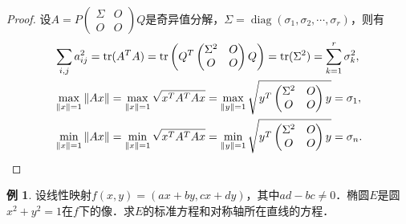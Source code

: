 \documentclass[a4paper,fontset=windows]{ctexbook}
\theoremstyle{definition}
\newtheorem{example}{例}[chapter]
\DeclareMathOperator{\diag}{diag}
\DeclareMathOperator{\tr}{tr}
\begin{document}
\begin{proof}
设$A=P\begin{pmatrix}\Sigma&O \\ O&O\end{pmatrix}Q$是奇异值分解，$\Sigma=\diag(\sigma_1,\sigma_2,\cdots,\sigma_r)$，则有
\begin{align*}
&\sum_{i,j}a_{ij}^2=\tr(A^TA)=\tr\left(Q^T\begin{pmatrix}\Sigma^2&O \\ O&O\end{pmatrix}Q\right)=\tr(\Sigma^2)=\sum_{k=1}^r\sigma_k^2, \\
&\max_{\|x\|=1}\|Ax\|=\max_{\|x\|=1}\sqrt{x^TA^TAx}=\max_{\|y\|=1}\sqrt{y^T\begin{pmatrix}\Sigma^2&O \\ O&O\end{pmatrix}y}=\sigma_1, \\
&\min_{\|x\|=1}\|Ax\|=\min_{\|x\|=1}\sqrt{x^TA^TAx}=\min_{\|y\|=1}\sqrt{y^T\begin{pmatrix}\Sigma^2&O \\ O&O\end{pmatrix}y}=\sigma_n.\qedhere
\end{align*}
\end{proof}

\begin{example}\label{ex6.8}
设线性映射$f(x,y)=(ax+by,cx+dy)$，其中$ad-bc\ne 0$．椭圆$E$是圆$x^2+y^2=1$在$f$下的像．求$E$的标准方程和对称轴所在直线的方程．
\end{example}
\end{document}
